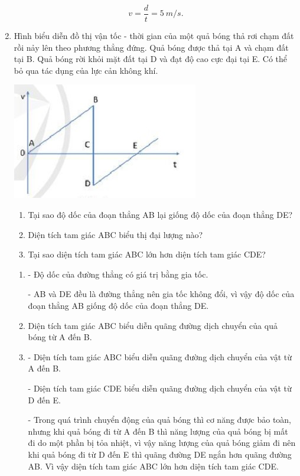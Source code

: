 \begin{enumerate}[label=\bfseries Câu \arabic*:]
{\begin{enumerate}[label=\alph*)]
			$$v = \dfrac{d}{t} = \SI{5}{m/s}.$$
		\end{enumerate}
	}
	\item {}

	
	{Hình biểu diễn đồ thị vận tốc - thời gian của một quả bóng thả rơi chạm đất rồi nảy lên theo phương thẳng đứng. Quả bóng được thả tại A và chạm đất tại B. Quả bóng rời khỏi mặt đất tại D và đạt độ cao cực đại tại E. Có thể bỏ qua tác dụng của lực cản không khí.
		\begin{center}
			\includegraphics[scale=1]{../figs/VN10-2022-PH-TP012-6.jpg}
		\end{center}
		
		\begin{enumerate}[label=\alph*)]
			\item Tại sao độ dốc của đoạn thẳng AB lại giống độ dốc của đoạn thẳng DE?
			\item Diện tích tam giác ABC biểu thị đại lượng nào?
			\item Tại sao diện tích tam giác ABC lớn hơn diện tích tam giác CDE?
		\end{enumerate}
	}

	\hideall
	{	
		\begin{enumerate}[label=\alph*)]
			\item - Độ dốc của đường thẳng có giá trị bằng gia tốc.
			
			- AB và DE đều là đường thẳng nên gia tốc không đổi, vì vậy độ dốc của đoạn thẳng AB giống độ dốc của đoạn thẳng DE.
			
			
			\item Diện tích tam giác ABC biểu diễn quãng đường dịch chuyển của quả bóng từ A đến B.
			
			
			\item - Diện tích tam giác ABC biểu diễn quãng đường dịch chuyển của vật từ A đến B.
			
			- Diện tích tam giác CDE biểu diễn quãng đường dịch chuyển của vật từ D đến E.
			
			- Trong quá trình chuyển động của quả bóng thì cơ năng được bảo toàn, nhưng khi quả bóng đi từ A đến B thì năng lượng của quả bóng bị mất đi do một phần bị tỏa nhiệt, vì vậy năng lượng của quả bóng giảm đi nên khi quả bóng đi từ D đến E thì quãng đường DE ngắn hơn quãng đường AB. Vì vậy diện tích tam giác ABC lớn hơn diện tích tam giác CDE.
			
			
		\end{enumerate}
	}
\end{enumerate}